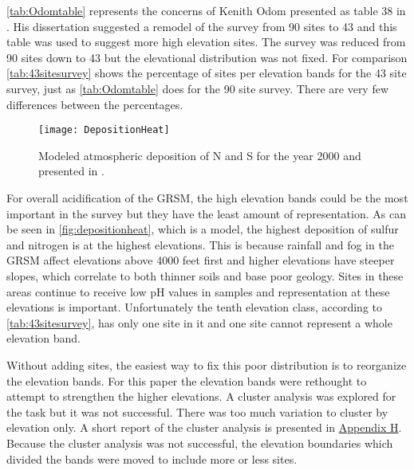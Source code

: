 



\autoref{tab:Odomtable} represents the concerns of Kenith Odom presented as table 38 in \citet{odom2003}.
His dissertation suggested a remodel of the survey from 90 sites to 43 and this table was used to suggest more high elevation sites.
The survey was reduced from 90 sites down to 43 but the elevational distribution was not fixed.
For comparison \autoref{tab:43sitesurvey} shows the percentage of sites per elevation bands for the 43 site survey, just as \autoref{tab:Odomtable} does for the 90 site survey.
There are very few differences between the percentages.

\begin{figure}[h!]
  \centering
  \texttt{[image: DepositionHeat]}\\
  \caption{ Modeled atmospheric deposition of N and S for the year 2000 and presented in \citet{weathers2006}.}\label{fig:depositionheat}
\end{figure}

For overall acidification of the GRSM, the high elevation bands could be the most important in the survey but they have the least amount of representation.
As can be seen in \autoref{fig:depositionheat}, which is a model, the highest deposition of sulfur and nitrogen is at the highest elevations.
This is because rainfall and fog in the GRSM affect elevations above 4000 feet first and higher elevations have steeper slopes, which correlate to both thinner soils and base poor geology.  
Sites in these areas continue to receive low pH values in samples and representation at these elevations is important.
Unfortunately the tenth elevation class, according to \autoref{tab:43sitesurvey}, has only one site in it and one site cannot represent a whole elevation band.

Without adding sites, the easiest way to fix this poor distribution is to reorganize the elevation bands. 
For this paper the elevation bands were rethought to attempt to strengthen the higher elevations.
A cluster analysis was explored for the task but it was not successful.
There was too much variation to cluster by elevation only.
A short report of the cluster analysis is presented in \hyperref[ch:CA]{Appendix H}.
Because the cluster analysis was not successful, the elevation boundaries which divided the bands were moved to include more or less sites.



